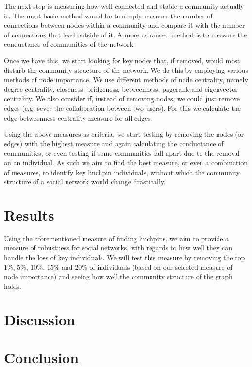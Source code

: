 \documentclass[9pt,twocolumn,twoside]{pnas-new}
\begin{document}
The next step is measuring how well-connected and stable a community actually is.
The most basic method would be to simply measure the number of connections between nodes within a community and compare it with the number of connections that lead outside of it.
A more advanced method is to measure the conductance \cite{leskovec-lang-mahoney} of communities of the network. 

Once we have this, we start looking for key nodes that, if removed, would most disturb the community structure of the network.
We do this by employing various methods of node importance.
We use different methods of node centrality, namely degree centrality, closeness, bridgeness, betweenness, pagerank and eigenvector centrality.
We also consider if, instead of removing nodes, we could just remove edges (e.g. sever the collaboration between two users).
For this we calculate the edge betweenness centrality measure for all edges.

Using the above measures as criteria, we start testing by removing the nodes (or edges) with the highest measure and 
again calculating the conductance of communities, 
or even testing if some communities fall apart due to the removal on an individual.
As such we aim to find the best measure, or even a combination of measures, to identify key linchpin individuals, 
without which the community structure of a social network would change drastically.

\section*{Results}

Using the aforementioned measure of finding linchpins, we aim to provide a measure of robustness for social networks,
with regards to how well they can handle the loss of key individuals. 
We will test this measure by removing the top $1\%$, $5\%$, $10\%$, $15\%$ and $20\%$ of individuals (based on our selected measure of node importance) 
and seeing how well the community structure of the graph holds.

\section*{Discussion}

\section*{Conclusion}


\end{document}
